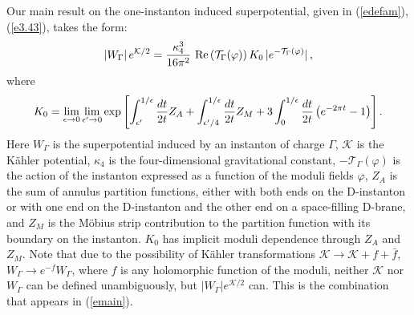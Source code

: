 \documentclass[12pt,a4paper]{article}
\newcommand{\be}{\begin{equation}}
\newcommand{\ee}{\end{equation}}
\newcommand{\refb}[1]{(\ref{#1})}
\def\Re{\,{\rm Re}\,}
\def\({\left(}
\def\){\right)}
\def\[{\left[}
\def\]{\right]}
\newcommand{\eps}{\epsilon}
\newcommand{\vp}{\varphi}
\newcommand{\cK}{\mathcal{K}}
\newcommand{\cT}{\mathcal{T}}
\def\KKZ{K_0}
\begin{document}
Our main result on the one-instanton induced superpotential, given in \refb{edefam}, \refb{e3.43},
takes the form:
\be\label{emain}
|W_\Gamma| \, e^{\cK/2}  = \frac{\kappa_4^3}{16\pi^{2}} \, \Re(\cT_\Gamma(\vp))\, K_0\,  |e^{-\cT_\Gamma(\vp)}|
\, ,
\ee
where
\be\label{edefamintro}
\KKZ= \lim_{\eps\to 0}\lim_{\eps'\to 0}
\exp\[\int_{\eps'}^{1/\eps}  {dt\over 2t} Z_A+\int_{\eps'/4}^{1/\eps}  {dt\over 2t}
Z_M+ 3\int_{0}^{1/\eps} {dt\over 2t} \(e^{-2\pi t} -1 \) \] .
\ee
Here $W_\Gamma$ is the superpotential induced by an instanton of charge $\Gamma$,
$\cK$ is the K\"ahler potential,
$\kappa_4$ is the four-dimensional gravitational constant, $-\cT_\Gamma(\vp)$ is the action of the instanton expressed
as a function of the moduli fields $\vp$,
$Z_A$ is the sum of annulus partition functions, either with
both ends on the D-instanton or with one end on the D-instanton and the other end on a space-filling D-brane,
and $Z_M$ is the M\"{o}bius strip contribution to the partition function
with its boundary on the instanton. $K_0$ has implicit moduli dependence
through $Z_A$ and $Z_M$. Note that due to the possibility of
K\"ahler transformations $\cK\to \cK + f +\bar f$,
$W_\Gamma\to e^{-f}W_\Gamma$, where $f$ is any holomorphic function of the moduli,
neither $\cK$  nor $W_\Gamma$ can be
defined unambiguously, but $|W_\Gamma|e^{\cK/2}$ can. This is the combination
that appears in  \refb{emain}.
\end{document}
